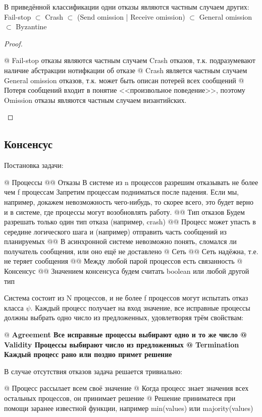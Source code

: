 \begin{stmt}
В приведённой классификации одни отказы являются частным случаем других:
Fail-stop $\subset$ Crash $\subset$ (Send omission | Receive omission) $\subset$ General omission $\subset$ Byzantine
\end{stmt}
\begin{proof}
\begin{el}[ul]
@ Fail-stop отказы являются частным случаем Crash отказов, т.к. подразумевают наличие абстракции нотифкации об отказе
@ Crash является частным случаем General omission отказов, т.к. может быть описан потерей всех сообщений
@ Потеря сообщений входит в понятие <<произвольное поведение>>, поэтому Omission отказы являются частным случаем византийских.
\end{el}
\end{proof}

\subsection{Консенсус}
Постановка задачи:

\begin{el}[ul]
@ Процессы
@@ Отказы 
 В системе из n процессов разрешим отказывать не более чем f процессам
 Запретим процессам подниматься после падения. Если мы, например, докажем невозможность чего-нибудь, то скорее всего, это будет верно и в системе, где процессы могут возобновлять работу.
@@ Тип отказов Будем разрешать только один тип отказа (например, crash)
@@ Процесс может упасть в середине логического шага и (например) отправить часть сообщений из планируемых
@@ В асинхронной системе невозможно понять, сломался ли получатель сообщения, или оно ещё не доставлено
@ Сеть
@@ Сеть надёжна, т.е. не теряет сообщения
@@ Между любой парой процессов есть связанность
@ Консенсус
@@ Значением консенсуса будем считать boolean или любой другой тип
\end{el}

Система состоит из N процессов, и не более f процессов могут испытать отказ класса $\psi$. Каждый процесс получает на вход значение, все исправные процессы должны выбрать одно число из предложенных, удовлетворяя трём свойствам:
\begin{el}[ul]
@ \bf{Agreement} Все исправные процессы выбирают одно и то же число
@ \bf{Validity} Процессы выбирают число из предложенных
@ \bf{Termination} Каждый процесс рано или поздно примет решение
\end{el}

В случае отсутствия отказов задача решается тривиально:
\begin{el}[ul]
@ Процесс рассылает всем своё значение
@ Когда процесс знает значения всех остальных процессов, он принимает решение
@ Решение приниматеся при помощи заранее известной функции, например min(values) или majority(values)
\end{el}


